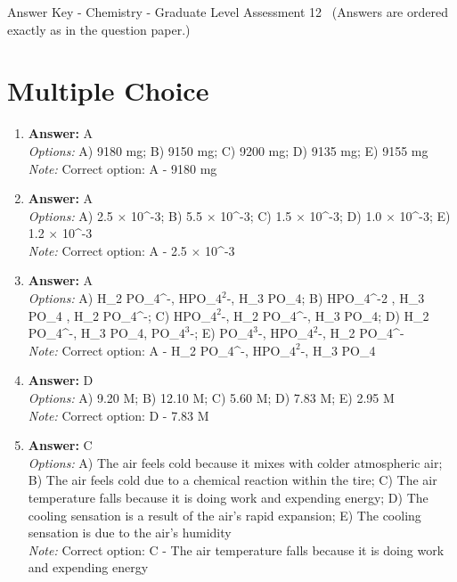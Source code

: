 \documentclass[12pt]{article}
\begin{document}
\begin{center}
Answer Key - Chemistry - Graduate Level Assessment 12 \
\small (Answers are ordered exactly as in the question paper.)
\end{center}

\section*{Multiple Choice}
\begin{enumerate}[label=\arabic*.]
\item \textbf{Answer:} A
\\ \textit{Options:} A) 9180 mg; B) 9150 mg; C) 9200 mg; D) 9135 mg; E) 9155 mg
\\ \textit{Note:} Correct option: A - 9180 mg
\item \textbf{Answer:} A
\\ \textit{Options:} A) 2.5 \ensuremath{\times} 10^-3; B) 5.5 \ensuremath{\times} 10^-3; C) 1.5 \ensuremath{\times} 10^-3; D) 1.0 \ensuremath{\times} 10^-3; E) 1.2 \ensuremath{\times} 10^-3
\\ \textit{Note:} Correct option: A - 2.5 \ensuremath{\times} 10^-3
\item \textbf{Answer:} A
\\ \textit{Options:} A) H\_2 PO\_4^-, HPO\_$4^2$-, H\_3 PO\_4; B) HPO\_4^-2 , H\_3 PO\_4 , H\_2 PO\_4^-; C) HPO\_$4^2$-, H\_2 PO\_4^-, H\_3 PO\_4; D) H\_2 PO\_4^-, H\_3 PO\_4, PO\_$4^3$-; E) PO\_$4^3$-, HPO\_$4^2$-, H\_2 PO\_4^-
\\ \textit{Note:} Correct option: A - H\_2 PO\_4^-, HPO\_$4^2$-, H\_3 PO\_4
\item \textbf{Answer:} D
\\ \textit{Options:} A) 9.20 M; B) 12.10 M; C) 5.60 M; D) 7.83 M; E) 2.95 M
\\ \textit{Note:} Correct option: D - 7.83 M
\item \textbf{Answer:} C
\\ \textit{Options:} A) The air feels cold because it mixes with colder atmospheric air; B) The air feels cold due to a chemical reaction within the tire; C) The air temperature falls because it is doing work and expending energy; D) The cooling sensation is a result of the air's rapid expansion; E) The cooling sensation is due to the air's humidity
\\ \textit{Note:} Correct option: C - The air temperature falls because it is doing work and expending energy
\end{enumerate}
\end{document}
